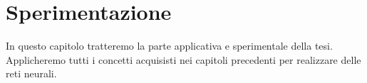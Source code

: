 \chapter{Sperimentazione}
In questo capitolo tratteremo la parte applicativa e sperimentale della tesi.
Applicheremo tutti i concetti acquisisti nei capitoli precedenti per realizzare 
delle reti neurali.




